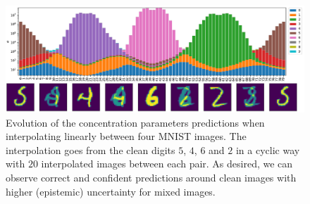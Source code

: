 \begin{figure}[ht]
    \centering
        \includegraphics[width=.9 \textwidth]{sections/006_neurips2020/figures/image_interpolation_uncertainty4.pdf}
        
    \caption{Evolution of the concentration parameters predictions when interpolating linearly between four MNIST images. The interpolation goes from the clean digits $5$, $4$, $6$ and $2$ in a cyclic way with $20$ interpolated images between each pair. As desired, we can observe correct and confident predictions around clean images with higher (epistemic) uncertainty for mixed images.}
    \label{epistemic_interpolation}
\end{figure}

